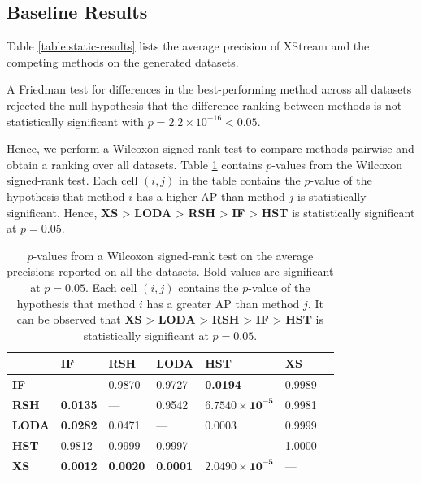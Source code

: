 \subsection{Baseline Results}

Table \ref{table:static-results} lists the average precision of XStream and the competing methods on the generated datasets.

A Friedman test for differences in the best-performing method across all datasets rejected the null hypothesis that the difference ranking between methods is not statistically significant with $p=2.2\times10^{-16} < 0.05$.

Hence, we perform a Wilcoxon signed-rank test to compare methods pairwise and obtain a ranking over all datasets. Table \ref{table:wilcoxon-all} contains $p$-values from the Wilcoxon signed-rank test. Each cell $(i,j)$ in the table contains the $p$-value of the hypothesis that method $i$ has a higher AP than method $j$ is statistically significant. Hence, \textbf{XS} > \textbf{LODA} > \textbf{RSH} > \textbf{IF} > \textbf{HST} is statistically significant at $p=0.05$.
\begin{table}[h!]
		\centering
    \begin{tabular}{lllllll}
    \toprule
    ~        & \textbf{IF}   & \textbf{RSH}    & \textbf{LODA}      & \textbf{HST}  & \textbf{XS} \\
		\midrule
    \textbf{IF}  	 & ---       			& 0.9870    		& 0.9727   			& \textbf{0.0194}   						& 0.9989       \\
    \textbf{RSH}   & \textbf{0.0135} 	& ---       		& 0.9542   			& $\pmb{6.7540\times10^{-5}}$ & 0.9981       \\
    \textbf{LODA}  & \textbf{0.0282} 	& 0.0471    		& ---      			& 0.0003   							& 0.9999      \\
    \textbf{HST} 	 & 0.9812    			& 0.9999    		& 0.9997   			& ---         					& 1.0000       \\
    \textbf{XS}    & \textbf{0.0012} & \textbf{0.0020} & \textbf{0.0001} & $\pmb{2.0490\times10^{-5}}$  & ---       \\
		\bottomrule
    \end{tabular}
    \caption{$p$-values from a Wilcoxon signed-rank test on the average precisions reported on all the datasets. Bold values are significant at $p=0.05$. Each cell $(i,j)$ contains the $p$-value of the hypothesis that method $i$ has a greater AP than method $j$. It can be observed that \textbf{XS} > \textbf{LODA} > \textbf{RSH} > \textbf{IF} > \textbf{HST} is statistically significant at $p=0.05$.}
		\label{table:wilcoxon-all}
\end{table}

